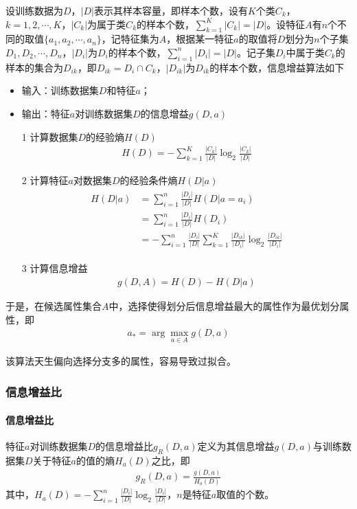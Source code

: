 设训练数据为$D$，$|D|$表示其样本容量，即样本个数，设有$K$个类$C_k$，$k=1,2,\cdots,K$，$|C_k|$为属于类$C_k$的样本个数，$\sum_{k=1}^K|C_k|=|D|$。设特征$A$有$n$个不同的取值$\{ a_1,a_2,\cdots,a_n \}$，记特征集为$A$，根据某一特征$a$的取值将$D$划分为$n$个子集$D_1,D_2,\cdots,D_n$，$|D_i|$为$D_i$的样本个数，$\sum_{i=1}^n|D_i|=|D|$。记子集$D_i$中属于类$C_k$的样本的集合为$D_{ik}$，即$D_{ik}=D_i\cap C_k$，$|D_{ik}|$为$D_{ik}$的样本个数，信息增益算法如下
\begin{itemize}
\item 输入：训练数据集$D$和特征$a$；
\item 输出：特征$a$对训练数据集$D$的信息增益$g(D,a)$
\item[1] 计算数据集$D$的经验熵$H(D)$
\begin{eqnarray}
H(D)=-\sum_{k=1}^K \frac{|C_k|}{|D|}\log_2\frac{|C_k|}{|D|}
\end{eqnarray}
\item[2] 计算特征$a$对数据集$D$的经验条件熵$H(D|a)$
\begin{eqnarray}
\begin{aligned}
H(D|a)&=\sum_{i=1}^n \frac{|D_i|}{|D|}H(D|a=a_i)\\
&=\sum_{i=1}^n\frac{|D_i|}{|D|}H(D_i)\\
&=-\sum_{i=1}^n\frac{|D_i|}{|D|}\sum_{k=1}^K\frac{|D_{ik}|}{|D_i|}\log_2\frac{|D_{ik}|}{|D_i|}
\end{aligned}
\end{eqnarray}
\item[3] 计算信息增益
\begin{eqnarray}
g(D,A)=H(D)-H(D|a)
\end{eqnarray}
\end{itemize}

于是，在候选属性集合$A$中，选择使得划分后信息增益最大的属性作为最优划分属性，即
\begin{eqnarray}
a_*=\arg\max_{a\in A}g(D,a)
\end{eqnarray}

该算法天生偏向选择分支多的属性，容易导致过拟合。

\subsubsection{信息增益比}
\paragraph{信息增益比}特征$a$对训练数据集$D$的信息增益比$g_R(D,a)$定义为其信息增益$g(D,a)$与训练数据集$D$关于特征$a$的值的熵$H_a(D)$之比，即
\begin{eqnarray}
g_R(D,a)=\frac{g(D,a)}{H_a(D)}
\end{eqnarray}
其中，$H_a(D)=-\sum_{i=1}^n \frac{|D_i|}{|D|}\log_2\frac{|D_i|}{|D|}$，$n$是特征$a$取值的个数。

